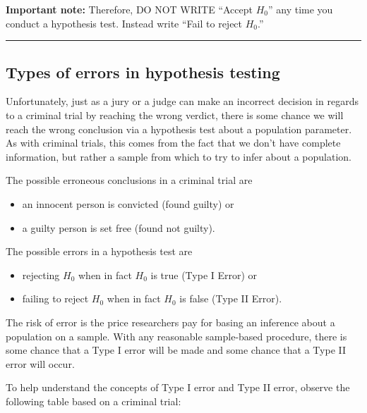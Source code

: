 \documentclass[12pt, krantz2,]{krantz}
\providecommand{\tightlist}{%
  \setlength{\itemsep}{0pt}\setlength{\parskip}{0pt}}
\begin{document}
\textbf{Important note:} Therefore, DO NOT WRITE ``Accept \(H_0\)'' any time you conduct a hypothesis test. Instead write ``Fail to reject \(H_0\).''

\begin{center}\rule{0.5\linewidth}{\linethickness}\end{center}

\hypertarget{types-of-errors-in-hypothesis-testing}{%
\subsection{Types of errors in hypothesis testing}\label{types-of-errors-in-hypothesis-testing}}

Unfortunately, just as a jury or a judge can make an incorrect decision in regards to a criminal trial by reaching the wrong verdict, there is some chance we will reach the wrong conclusion via a hypothesis test about a population parameter. As with criminal trials, this comes from the fact that we don't have complete information, but rather a sample from which to try to infer about a population.

The possible erroneous conclusions in a criminal trial are

\begin{itemize}
\tightlist
\item
  an innocent person is convicted (found guilty) or
\item
  a guilty person is set free (found not guilty).
\end{itemize}

The possible errors in a hypothesis test are

\begin{itemize}
\tightlist
\item
  rejecting \(H_0\) when in fact \(H_0\) is true (Type I Error) or
\item
  failing to reject \(H_0\) when in fact \(H_0\) is false (Type II Error).
\end{itemize}

The risk of error is the price researchers pay for basing an inference about a population on a sample. With any reasonable sample-based procedure, there is some chance that a Type I error will be made and some chance that a Type II error will occur.

To help understand the concepts of Type I error and Type II error, observe the following table based on a criminal trial:
\end{document}
